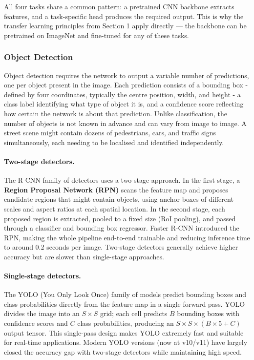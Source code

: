 All four tasks share a common pattern: a pretrained CNN backbone extracts features, and a task-specific head produces the required output. This is why the transfer learning principles from Section 1 apply directly — the backbone can be pretrained on ImageNet and fine-tuned for any of these tasks.

\subsubsection{Object Detection}

Object detection requires the network to output a variable number of predictions, one per object present in the image. Each prediction consists of a bounding box - defined by four coordinates, typically the centre position, width, and height - a class label identifying what type of object it is, and a confidence score reflecting how certain the network is about that prediction. Unlike classification, the number of objects is not known in advance and can vary from image to image. A street scene might contain dozens of pedestrians, cars, and traffic signs simultaneously, each needing to be localised and identified independently.

\paragraph{Two-stage detectors.}
The R-CNN family of detectors \parencite{Ren2015} uses a two-stage approach. In the first stage, a \textbf{Region Proposal Network (RPN)} scans the feature map and proposes candidate regions that might contain objects, using anchor boxes of different scales and aspect ratios at each spatial location. In the second stage, each proposed region is extracted, pooled to a fixed size (RoI pooling), and passed through a classifier and bounding box regressor. Faster R-CNN introduced the RPN, making the whole pipeline end-to-end trainable and reducing inference time to around 0.2 seconds per image. Two-stage detectors generally achieve higher accuracy but are slower than single-stage approaches.

\paragraph{Single-stage detectors.}
The YOLO \parencite{Redmon2016} (You Only Look Once) family of models predict bounding boxes and class probabilities directly from the feature map in a single forward pass. YOLO divides the image into an $S \times S$ grid; each cell predicts $B$ bounding boxes with confidence scores and $C$ class probabilities, producing an $S \times S \times (B \times 5 + C)$ output tensor. This single-pass design makes YOLO extremely fast and suitable for real-time applications. Modern YOLO versions (now at v10/v11) have largely closed the accuracy gap with two-stage detectors while maintaining high speed.

